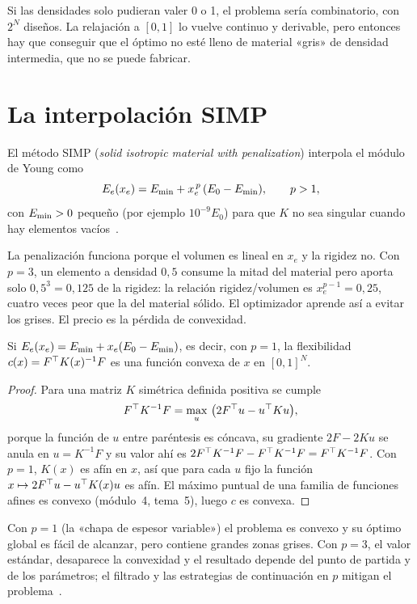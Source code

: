 Si las densidades solo pudieran valer 0 o 1, el problema sería combinatorio, con $2^N$ diseños. La relajación a $[0,1]$ lo vuelve continuo y derivable, pero entonces hay que conseguir que el óptimo no esté lleno de material «gris» de densidad intermedia, que no se puede fabricar.

\section{La interpolación SIMP}

\begin{definicion}\label{def:simp}
El método SIMP (\emph{solid isotropic material with penalization}) interpola el módulo de Young como
\[
E_e(x_e)=E_{\min}+x_e^{\,p}\,(E_0-E_{\min}),\qquad p>1,
\]
con $E_{\min}>0$ pequeño (por ejemplo $10^{-9}E_0$) para que $K$ no sea singular cuando hay elementos vacíos~\cite[§2.1]{andreassen}.
\end{definicion}

La penalización funciona porque el volumen es lineal en $x_e$ y la rigidez no. Con $p=3$, un elemento a densidad $0{,}5$ consume la mitad del material pero aporta solo $0{,}5^3=0{,}125$ de la rigidez: la relación rigidez/volumen es $x_e^{p-1}=0{,}25$, cuatro veces peor que la del material sólido. El optimizador aprende así a evitar los grises. El precio es la pérdida de convexidad.

\begin{teorema}[Convexidad con $p=1$]\label{teo:convexo}
Si $E_e(x_e)=E_{\min}+x_e(E_0-E_{\min})$, es decir, con $p=1$, la flexibilidad $c(x)=F^\top K(x)^{-1}F$ es una función convexa de $x$ en $[0,1]^N$.
\end{teorema}

\begin{proof}
Para una matriz $K$ simétrica definida positiva se cumple
\[
F^\top K^{-1}F=\max_{u}\ \bigl(2F^\top u-u^\top Ku\bigr),
\]
porque la función de $u$ entre paréntesis es cóncava, su gradiente $2F-2Ku$ se anula en $u=K^{-1}F$ y su valor ahí es $2F^\top K^{-1}F-F^\top K^{-1}F=F^\top K^{-1}F$. Con $p=1$, $K(x)$ es afín en $x$, así que para cada $u$ fijo la función $x\mapsto 2F^\top u-u^\top K(x)u$ es afín. El máximo puntual de una familia de funciones afines es convexo (módulo~4, tema~5), luego $c$ es convexa.
\end{proof}

Con $p=1$ (la «chapa de espesor variable») el problema es convexo y su óptimo global es fácil de alcanzar, pero contiene grandes zonas grises. Con $p=3$, el valor estándar, desaparece la convexidad y el resultado depende del punto de partida y de los parámetros; el filtrado y las estrategias de continuación en $p$ mitigan el problema~\cite{sigpet}.

